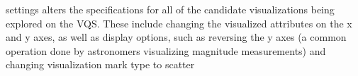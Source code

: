  settings 
alters the specifications 
for all of the candidate visualizations being explored 
on the VQS. 
These include changing 
the visualized attributes on the x and y axes, 
as well as display options, 
such as reversing the y axes 
(a common operation done by astronomers visualizing magnitude measurements) 
and changing visualization mark type to scatter
